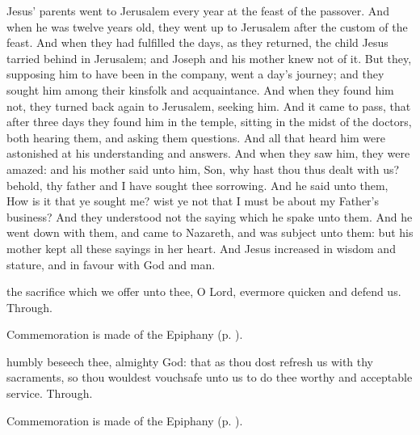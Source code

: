 \clearpage
{}
 Jesus' parents went to Jerusalem every year at the feast of the passover. And when he was twelve years old, they went up to Jerusalem after the custom of the feast. And when they had fulfilled the days, as they returned, the child Jesus tarried behind in Jerusalem; and Joseph and his mother knew not of it. But they, supposing him to have been in the company, went a day's journey; and they sought him among their kinsfolk and acquaintance. And when they found him not, they turned back again to Jerusalem, seeking him. And it came to pass, that after three days they found him in the temple, sitting in the midst of the doctors, both hearing them, and asking them questions. And all that heard him were astonished at his understanding and answers. And when they saw him, they were amazed: and his mother said unto him, Son, why hast thou thus dealt with us? behold, thy father and I have sought thee sorrowing. And he said unto them, How is it that ye sought me? wist ye not that I must be about my Father's business? And they understood not the saying which he spake unto them. And he went down with them, and came to Nazareth, and was subject unto them: but his mother kept all these sayings in her heart. And Jesus increased in wisdom and stature, and in favour with God and man.


\secret
{} the sacrifice which we offer unto thee, O Lord, evermore quicken and defend us. Through.


\begin{rubric}
    Commemoration is made of the Epiphany (p. \pageref{EpiphanyMassSecret}).
\end{rubric}


\postcommunion
{} humbly beseech thee, almighty God: that as thou dost refresh us with thy sacraments, so thou wouldest vouchsafe unto us to do thee worthy and acceptable service. Through.
\begin{rubric}
    Commemoration is made of the Epiphany (p. \pageref{EpiphanyMassPostcommunion}).
\end{rubric}

